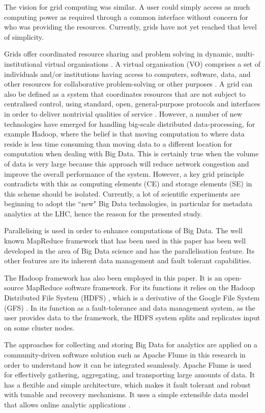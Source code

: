The vision for grid computing was similar. A user could simply access as much computing power as required through a common interface without concern for who was providing the resources. Currently, grids have not yet reached that level of simplicity.

Grids offer coordinated resource sharing and problem solving in dynamic, multi-institutional virtual organisations \cite{Foster10}. A virtual organisation (VO) comprises a set of individuals and/or institutions having access to computers, software, data, and other resources for collaborative problem-solving or other purposes \cite{Laure11}. A grid can also be defined as a system that coordinates resources that are not subject to centralised control, using standard, open, general-purpose protocols and interfaces in order to deliver nontrivial qualities of service \cite{Foster12}. However, a number of new technologies have emerged for handling big-scale distributed data-processing, for example Hadoop, where the belief is that moving computation to where data reside is less time consuming than moving data to a different location for computation when dealing with Big Data. This is certainly true when the volume of data is very large because this approach will reduce network congestion and improve the overall performance of the system. However, a key grid principle contradicts with this as computing elements (CE) and storage elements (SE) in this scheme should be isolated. Currently, a lot of scientific experiments are beginning to adopt the ``new" Big Data technologies, in particular for metadata analytics at the LHC, hence the reason for the presented study.

Parallelising is used in order to enhance computations of Big Data. The well known MapReduce \cite{Dean13} framework that has been used in this paper has been well developed in the area of Big Data science and has the parallelisation feature. Its other features are its inherent data management and fault tolerant capabilities.

The Hadoop framework has also been employed in this paper. It is an open-source MapReduce software framework. For its functions it relies on the Hadoop Distributed File System (HDFS) \cite{Shvachko14}, which is a derivative of the Google File System (GFS) \cite{Ghemawat15}. In its function as a fault-tolerance and data management system, as the user provides data to the framework, the HDFS system splits and replicates input on some cluster nodes.

	The approaches for collecting and storing Big Data for analytics are applied on a community-driven software solution such as Apache Flume in this research in order to understand how it can be integrated seamlessly. Apache Flume is used for effectively gathering, aggregating, and transporting large amounts of data. It has a flexible and simple architecture, which makes it fault tolerant and robust with tunable and recovery mechanisms. It uses a simple extensible data model that allows online analytic applications \cite{Flume16}.

